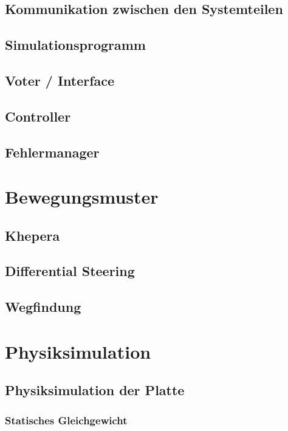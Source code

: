 \documentclass[ngerman]{scrartcl}
\begin{document}
\subsection{Kommunikation zwischen den Systemteilen}
\subsection{Simulationsprogramm}\label{graphics} %
\subsection{Voter / Interface}
\subsection{Controller}
\subsection{Fehlermanager}
\section{Bewegungsmuster}
\subsection{Khepera}\label{khepera}
\subsection{Differential Steering}\label{diffs}
\subsection{Wegfindung}
\section{Physiksimulation}
\subsection{Physiksimulation der Platte}
\subsubsection{Statisches Gleichgewicht}
\end{document}
